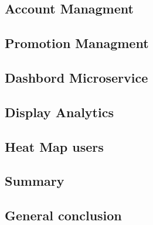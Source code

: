 \subsection{Account Managment}
\label{sec:sec01}
\subsection{Promotion Managment}
\label{sec:sec01}
\subsection{Dashbord Microservice}
\label{sec:sec01}
\subsection{Display Analytics}
\label{sec:sec01}
\subsection{Heat Map users}
\label{sec:sec01}
\subsection{Summary}
\label{sec:sec01}

\subsection{General conclusion}
\label{sec:sec01}


